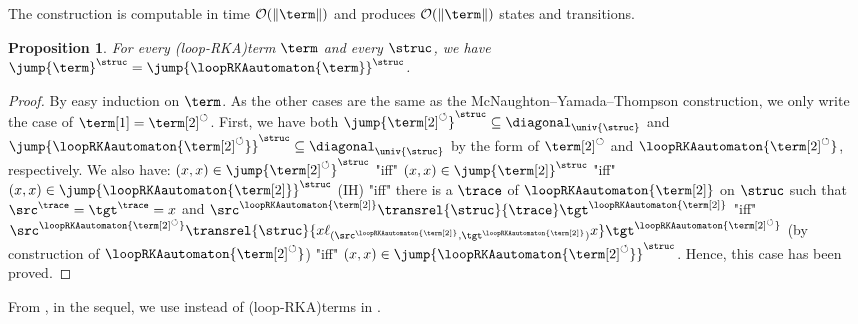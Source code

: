 \documentclass[10pt,a4paper]{article}
\newtheorem{proposition}[theorem]{Proposition}
\theoremstyle{definition}
\theoremstyle{remark}
\DeclarePairedDelimiter\tuple{(}{)}
\newcommand{\lop}{\circlearrowleft}
\begin{document}
The construction is computable in time $\mathcal{O}(\|\term\|)$ and produces
$\mathcal{O}(\|\term\|)$ states and transitions.

\begin{proposition}\label{prop: automata}
    For every \kl(loop-RKA){term} $\term$ and every  $\struc$,
    we have $\jump{\term}^{\struc} = \jump{\loopRKAautomaton{\term}}^{\struc}$.
\end{proposition}
\begin{proof}
    By easy induction on $\term$.
    As the other cases are the same as the McNaughton--Yamada--Thompson construction,
    we only write the case of $\term[1] = \term[2]^{\lop}$.
    First, we have both $\jump{\term[2]^{\lop}}^{\struc} \subseteq \diagonal_{\univ{\struc}}$ and $\jump{\loopRKAautomaton{\term[2]^{\lop}}}^{\struc} \subseteq \diagonal_{\univ{\struc}}$ by the form of $\term[2]^{\lop}$ and $\loopRKAautomaton{\term[2]^{\lop}}$, respectively.
    We also have:
    $\tuple{x, x} \in \jump{\term[2]^{\lop}}^{\struc}$ "iff"
    $\tuple{x, x} \in \jump{\term[2]}^{\struc}$ "iff"
    $\tuple{x, x} \in \jump{\loopRKAautomaton{\term[2]}}^{\struc}$ (IH) "iff"
    there is a  $\trace$ of $\loopRKAautomaton{\term[2]}$ on $\struc$ such that $\src^{\trace} = \tgt^{\trace} = x$
    and $\src^{\loopRKAautomaton{\term[2]}} \transrel{\struc}{\trace} \tgt^{\loopRKAautomaton{\term[2]}}$
    "iff"
    $\src^{\loopRKAautomaton{\term[2]^{\lop}}}
    \transrel{\struc}{x \ell_{\tuple{\src^{\loopRKAautomaton{\term[2]}}, \tgt^{\loopRKAautomaton{\term[2]}}}} x}
    \tgt^{\loopRKAautomaton{\term[2]^{\lop}}}$ (by construction of $\loopRKAautomaton{\term[2]^{\lop}}$) "iff"
    $\tuple{x, x} \in \jump{\loopRKAautomaton{\term[2]^{\lop}}}^{\struc}$.
    Hence, this case has been proved.
\end{proof}
From ,
in the sequel,
we use  instead of \kl(loop-RKA){terms} in .
%
\end{document}
